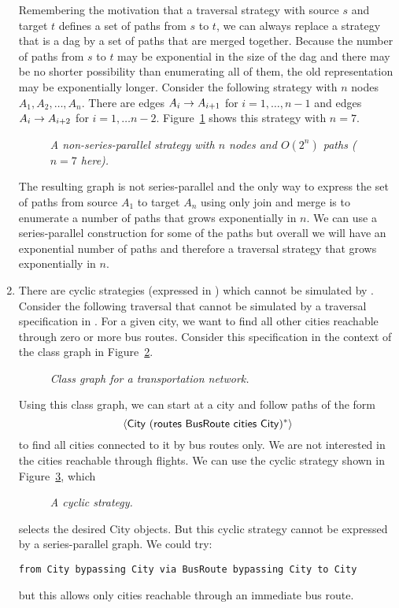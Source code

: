 \begin{enumerate}
Remembering the motivation that a traversal strategy with source $s$
and target $t$ defines a set of paths from $s$ to $t$, we can always
replace a strategy that is a dag by a set of paths that are merged
together.  Because the number of paths from $s$ to $t$ may be
exponential in the size of the dag and there may be no shorter
possibility than enumerating all of them, the old representation may
be exponentially longer.  Consider the following strategy with $n$
nodes $ A_1, A_2, \ldots, A_n $. There are edges
$A_i\stackrel{}{\rightarrow}A_{i+1}$ for $ i = 1, \ldots, n-1 $ and edges
$A_i\stackrel{}{\rightarrow}A_{i+2}$ for $i =1, \ldots n-2 $.
Figure~\ref{fig-expstrat} shows this strategy with $n=7$.
\begin{figure}
\centerline{}
\caption{\em A non-series-parallel strategy with $n$ nodes and $O(2^n)$ paths
($n=7$ here).}
\label{fig-expstrat}
\end{figure}
The resulting graph is not series-parallel and the only way to express
the set of paths from source $ A_1 $ to target $ A_n $ using only join
and merge is to enumerate a number of paths that grows exponentially
in $n$.  We can use a series-parallel construction for some of the
paths but overall we will have an exponential number of paths and
therefore a traversal strategy that grows exponentially in $n$.

\item There are cyclic strategies (expressed in \NEW) which cannot be
simulated by \OLD.  Consider the following traversal that cannot be
simulated by a traversal specification in \OLD. For a given city, we
want to find all other cities reachable through zero or more bus
routes. Consider this specification in the context of the class graph
in Figure~\ref{fig-citycd}.
\begin{figure}
\centerline{}
\caption{\em Class graph for a transportation network.}
\label{fig-citycd}
\end{figure}
Using this class graph, we can start at a city and follow paths of the
form $$\Seq{\mathsf{City\ }(\mathsf{routes\ BusRoute\ cities\
City})^*}$$ to find all cities connected to it by bus routes only. We
are not interested in the cities reachable through flights. We can use
the cyclic strategy shown in Figure~\ref{fig-cyclic-strategy}, which
\begin{figure}
\centerline{}
\caption{\em A cyclic strategy.}
\label{fig-cyclic-strategy}
\end{figure}
selects the desired {\sf City} objects. But this cyclic strategy
cannot be expressed by a series-parallel graph.  We could try:
\begin{verbatim}
from City bypassing City via BusRoute bypassing City to City
\end{verbatim}
but this allows only cities reachable through an immediate
bus route.

\end{enumerate}

